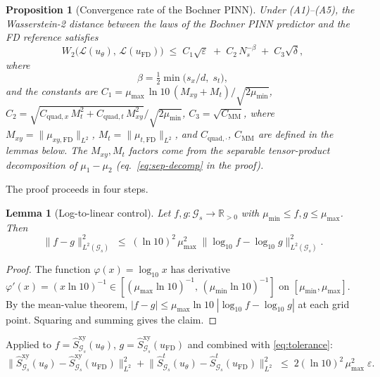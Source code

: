\documentclass[review,12pt]{elsarticle}
\newtheorem{proposition}{Proposition}
\newtheorem{lemma}{Lemma}
\begin{document}
\begin{proposition}[Convergence rate of the Bochner PINN]
\label{thm:main}
Under (A1)--(A5), the Wasserstein-2 distance between the laws of the
Bochner PINN predictor and the FD reference satisfies
\begin{equation}
W_2\bigl(\mathcal L(u_\theta),\,\mathcal L(u_{\mathrm{FD}})\bigr)
\;\le\; C_1\sqrt{\varepsilon}
\;+\; C_2\,N_s^{-\beta}
\;+\; C_3\sqrt{\delta},
\label{eq:main-bound}
\end{equation}
where
\begin{equation}
\beta = \tfrac{1}{2}\min\!\bigl(s_x / d,\; s_t\bigr),
\end{equation}
and the constants are
\(C_1 = \mu_{\max}\,\ln 10\,(M_{xy}+M_t) / \sqrt{2\mu_{\min}}\),
\(C_2 = \sqrt{C_{\mathrm{quad},x}\,M_t^2 + C_{\mathrm{quad},t}\,M_{xy}^2}
/ \sqrt{2\mu_{\min}}\),
\(C_3 = \sqrt{C_{\mathrm{MM}}}\),
where \(M_{xy} = \|\mu_{xy,\mathrm{FD}}\|_{L^2}\),
\(M_t = \|\mu_{t,\mathrm{FD}}\|_{L^2}\), and
\(C_{\mathrm{quad},\cdot}\), \(C_{\mathrm{MM}}\) are defined in
the lemmas below. The \(M_{xy},M_t\) factors come from the separable
tensor-product decomposition of \(\mu_1 - \mu_2\) (eq.\
\eqref{eq:sep-decomp} in the proof).
\end{proposition}

The proof proceeds in four steps.

\begin{lemma}[Log-to-linear control]
\label{lem:log-linear}
Let \(f, g : \mathcal G_s \to \mathbb R_{>0}\) with
\(\mu_{\min} \le f, g \le \mu_{\max}\). Then
\[
\|f - g\|^2_{L^2(\mathcal G_s)}
\;\le\; (\ln 10)^2\,\mu_{\max}^2\;
\|\log_{10} f - \log_{10} g\|^2_{L^2(\mathcal G_s)}.
\]
\end{lemma}
\begin{proof}
The function \(\varphi(x) = \log_{10} x\) has derivative
\(\varphi'(x) = (x \ln 10)^{-1}
\in [(\mu_{\max}\ln 10)^{-1},\, (\mu_{\min}\ln 10)^{-1}]\)
on \([\mu_{\min}, \mu_{\max}]\). By the mean-value theorem,
\(|f - g| \le \mu_{\max}\ln 10\;|\log_{10} f - \log_{10} g|\)
at each grid point. Squaring and summing gives the claim.
\end{proof}

Applied to \(f = \widehat S^{\mathrm{xy}}_{\mathcal G_s}(u_\theta)\),
\(g = \widehat S^{\mathrm{xy}}_{\mathcal G_s}(u_{\mathrm{FD}})\)
and combined with \eqref{eq:tolerance}:
\begin{equation}
\bigl\|\widehat S^{\mathrm{xy}}_{\mathcal G_s}(u_\theta)
- \widehat S^{\mathrm{xy}}_{\mathcal G_s}(u_{\mathrm{FD}})
\bigr\|^2_{L^2}
+ \bigl\|\widehat S^t_{\mathcal G_s}(u_\theta)
- \widehat S^t_{\mathcal G_s}(u_{\mathrm{FD}})
\bigr\|^2_{L^2}
\;\le\; 2(\ln 10)^2\,\mu_{\max}^2\;\varepsilon.
\label{eq:log-linear-applied}
\end{equation}
\end{document}

